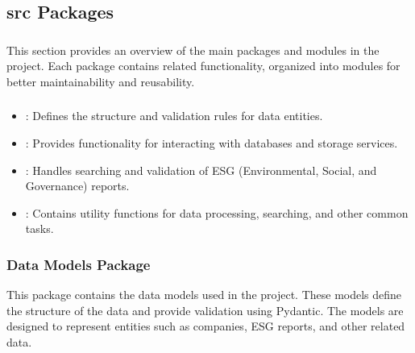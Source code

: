 \documentclass[letterpaper,10pt,english]{sphinxmanual}
\begin{document}
\sphinxstepscope


\subsection{src Packages}
\label{\detokenize{src:src-packages}}\label{\detokenize{src::doc}}\subsubsection*{}

\sphinxAtStartPar
This section provides an overview of the main packages and modules in the project. Each package contains related functionality, organized into modules for better maintainability and reusability.
\subsubsection*{}
\begin{itemize}
\item {} 
\sphinxAtStartPar
{}: Defines the structure and validation rules for data entities.

\item {} 
\sphinxAtStartPar
{}: Provides functionality for interacting with databases and storage services.

\item {} 
\sphinxAtStartPar
{}: Handles searching and validation of ESG (Environmental, Social, and Governance) reports.

\item {} 
\sphinxAtStartPar
{}: Contains utility functions for data processing, searching, and other common tasks.

\end{itemize}

\sphinxstepscope


\subsubsection{Data Models Package}
\label{\detokenize{src.data_models:data-models-package}}\label{\detokenize{src.data_models::doc}}
\sphinxAtStartPar
This package contains the data models used in the project. These models define the structure of the data
and provide validation using Pydantic. The models are designed to represent entities such as companies,
ESG reports, and other related data.
\end{document}
